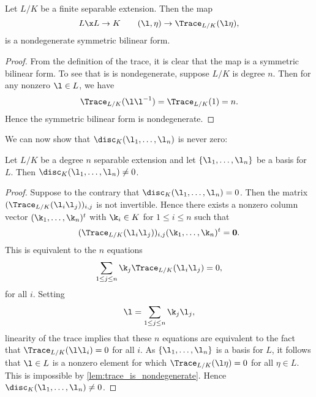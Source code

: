     \begin{lemma}\label{lem:trace_is_nondegenerate}
      Let $L/K$ be a finite separable extension. Then the map
      \[
        L \x L \to K \qquad (\l,\eta) \to \Trace_{L/K}(\l\eta),
      \]
      is a nondegenerate symmetric bilinear form.
    \end{lemma}
    \begin{proof}
      From the definition of the trace, it is clear that the map is a symmetric bilinear form. To see that is is nondegenerate, suppose $L/K$ is degree $n$. Then for any nonzero $\l \in L$, we have
      \[
        \Trace_{L/K}(\l\l^{-1}) = \Trace_{L/K}(1) = n.
      \]
      Hence the symmetric bilinear form is nondegenerate.
    \end{proof}

    We can now show that $\disc_{K}(\l_{1},\ldots,\l_{n})$ is never zero:

    \begin{proposition}\label{prop:discriminant_not_zero}
      Let $L/K$ be a degree $n$ separable extension and let $\{\l_{1},\ldots,\l_{n}\}$ be a basis for $L$. Then $\disc_{K}(\l_{1},\ldots,\l_{n}) \neq 0$.
    \end{proposition}
    \begin{proof}
      Suppose to the contrary that $\disc_{K}(\l_{1},\ldots,\l_{n}) = 0$. Then the matrix $(\Trace_{L/K}(\l_{i}\l_{j}))_{i,j}$ is not invertible. Hence there exists a nonzero column vector $(\k_{1},\ldots,\k_{n})^{t}$ with $\k_{i} \in K$ for $1 \le i \le n$ such that
      \[
        (\Trace_{L/K}(\l_{i}\l_{j}))_{i,j}(\k_{1},\ldots,\k_{n})^{t} = \mathbf{0}.
      \]
      This is equivalent to the $n$ equations
      \[
        \sum_{1 \le j \le n}\k_{j}\Trace_{L/K}(\l_{i}\l_{j}) = 0,
      \]
      for all $i$. Setting
      \[
        \l = \sum_{1 \le j \le n}\k_{j}\l_{j},
      \]
      linearity of the trace implies that these $n$ equations are equivalent to the fact that $\Trace_{L/K}(\l\l_{i}) = 0$ for all $i$. As $\{\l_{1},\ldots,\l_{n}\}$ is a basis for $L$, it follows that $\l \in L$ is a nonzero element for which $\Trace_{L/K}(\l\eta) = 0$ for all $\eta \in L$. This is impossible by \cref{lem:trace_is_nondegenerate}. Hence $\disc_{K}(\l_{1},\ldots,\l_{n}) \neq 0$.
    \end{proof}

